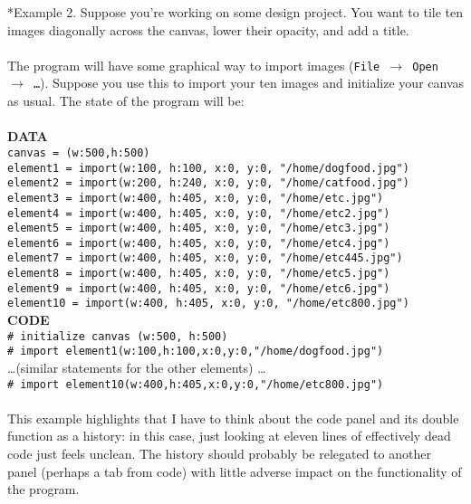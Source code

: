 \documentclass[12pt]{article}
\theoremstyle{remark}
\newcommand{\ttt}[1]{\texttt{#1}}
\begin{document}
\newpage

\begin{section}*{Example 2.}
Suppose you're working on some design project. You want to tile ten images diagonally across the canvas, lower their opacity, and add a title.
\\\\
The program will have some graphical way to import images (\ttt{File $\to$ Open $\to$ \ldots}). Suppose you use this to import your ten images and initialize your canvas as usual. The state of the program will be:
\\\\
\textbf{DATA}\\
\ttt{canvas = (w:500,h:500)}
\\
\ttt{element1 = import(w:100, h:100, x:0, y:0, "/home/dogfood.jpg")}
\\
\ttt{element2 = import(w:200, h:240, x:0, y:0, "/home/catfood.jpg")}\\
\ttt{element3 = import(w:400, h:405, x:0, y:0, "/home/etc.jpg")}\\
\ttt{element4 = import(w:400, h:405, x:0, y:0, "/home/etc2.jpg")}\\
\ttt{element5 = import(w:400, h:405, x:0, y:0, "/home/etc3.jpg")}\\
\ttt{element6 = import(w:400, h:405, x:0, y:0, "/home/etc4.jpg")}\\
\ttt{element7 = import(w:400, h:405, x:0, y:0, "/home/etc445.jpg")}\\
\ttt{element8 = import(w:400, h:405, x:0, y:0, "/home/etc5.jpg")}\\
\ttt{element9 = import(w:400, h:405, x:0, y:0, "/home/etc6.jpg")}\\
\ttt{element10 = import(w:400, h:405, x:0, y:0, "/home/etc800.jpg")}\\
\textbf{CODE}\\
\ttt{\# initialize canvas (w:500, h:500)}\\
\ttt{\# import element1(w:100,h:100,x:0,y:0,"/home/dogfood.jpg")}\\
\ldots (similar statements for the other elements) \ldots\\
\ttt{\# import element10(w:400,h:405,x:0,y:0,"/home/etc800.jpg")}\\
\\
This example highlights that I have to think about the code panel and its double function as a history: in this case, just looking at eleven lines of effectively dead code just feels unclean. The history should probably be relegated to another panel (perhaps a tab from code) with little adverse impact on the functionality of the program.

\end{section}
\end{document}

